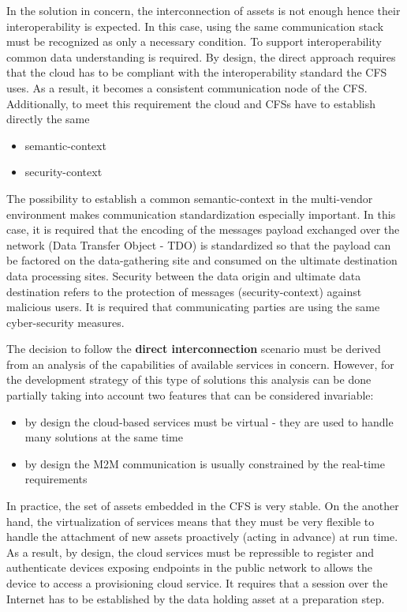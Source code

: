 \documentclass{jacsart}
\begin{document}
In the solution in concern, the interconnection of assets is not enough hence their interoperability is expected. In this case, using the same communication stack must be recognized as only a necessary condition. To support interoperability common data understanding is required. By design, the direct approach requires that the cloud has to be compliant with the interoperability standard the CFS uses. As a result, it becomes a consistent communication node of the CFS. Additionally, to meet this requirement the cloud and CFSs have to establish directly the same

\begin{itemize}
      \item semantic-context
      \item security-context
\end{itemize}

The possibility to establish a common semantic-context in the multi-vendor environment makes communication standardization especially important. In this case, it is required that the encoding of the messages payload exchanged over the network (Data Transfer Object - TDO) is standardized so that the payload can be factored on the data-gathering site and consumed on the ultimate destination data processing sites. Security between the data origin and ultimate data destination refers to the protection of messages (security-context) against malicious users. It is required that communicating parties are using the same cyber-security measures.

The decision to follow the \textbf{direct interconnection} scenario must be derived from an analysis of the capabilities of available services in concern. However, for the development strategy of this type of solutions this analysis can be done partially taking into account two features that can be considered invariable:

\begin{itemize}
      \item by design the cloud-based services must be virtual - they are used to handle many solutions at the same time
      \item by design the M2M communication is usually constrained by the real-time requirements
\end{itemize}

In practice, the set of assets embedded in the CFS is very stable. On the another hand, the virtualization of services means that they must be very flexible to handle the attachment of new assets proactively (acting in advance) at run time. As a result, by design, the cloud services must be repressible to register and authenticate devices exposing endpoints in the public network to allows the device to access a provisioning cloud service. It requires that a session over the Internet has to be established by the data holding asset at a preparation step.
\end{document}
